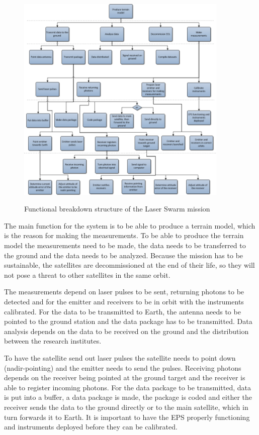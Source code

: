 \begin{figure}[ht!]
\begin{center}
\includegraphics[width=0.9\textwidth]{chapters/img/FBD.png}
\label{pic_FBS}
\caption{Functional breakdown structure of the Laser Swarm mission}
\end{center}
\end{figure}

The main function for the system is to be able to produce a terrain model, which is the reason for making the measurements. To be able to produce the terrain model the measurements need to be made, the data needs to be transferred to the ground and the data needs to be analyzed. Because the mission has to be sustainable, the satellites are decommissioned at the end of their life, so they will not pose a threat to other satellites in the same orbit.

The measurements depend on laser pulses to be sent, returning photons to be detected and for the emitter and receivers to be in orbit with the instruments calibrated. For the data to be transmitted to Earth, the antenna needs to be pointed to the ground station and the data package has to be transmitted. Data analysis depends on the data to be received on the ground and the distribution between the research institutes.

To have the satellite send out laser pulses the satellite needs to point down (nadir-pointing) and the emitter needs to send the pulses. Receiving photons depends on the receiver being pointed at the ground target and the receiver is able to register incoming photons. For the data package to be transmitted, data is put into a buffer, a data package is made, the package is coded and either the receiver sends the data to the ground directly or to the main satellite, which in turn forwards it to Earth. It is important to have the \ac{EPS} properly functioning and instruments deployed before they can be calibrated.

